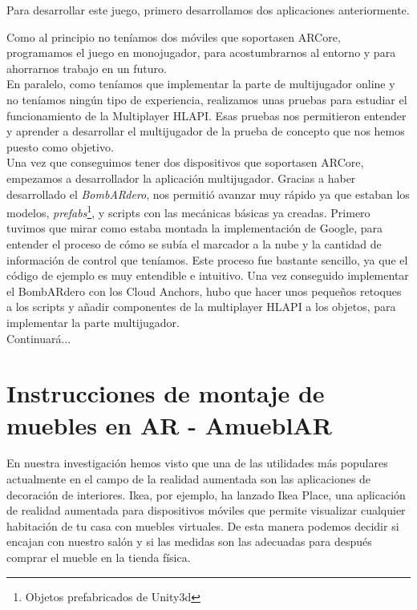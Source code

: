 Para desarrollar este juego, primero desarrollamos dos aplicaciones anteriormente.

Como al principio no teníamos dos móviles que soportasen ARCore, programamos el juego en monojugador, para acostumbrarnos al entorno y para ahorrarnos trabajo en un futuro.\\

En paralelo, como teníamos que implementar la parte de multijugador online y no teníamos ningún tipo de experiencia, realizamos unas pruebas para estudiar el funcionamiento de la Multiplayer HLAPI. Esas pruebas nos permitieron entender y aprender a desarrollar el multijugador de la prueba de concepto que nos hemos puesto como objetivo.\\

Una vez que conseguimos tener dos dispositivos que soportasen ARCore, empezamos a desarrollador la aplicación multijugador. Gracias a haber desarrollado el \textit{BombARdero}, nos permitió avanzar muy rápido ya que estaban los modelos, \textit{prefabs}\footnote{ Objetos prefabricados de Unity3d}, y scripts con las mecánicas básicas ya creadas. Primero tuvimos que mirar como estaba montada la implementación de Google, para entender el proceso de cómo se subía el marcador a la nube y la cantidad de información de control que teníamos. Este proceso fue bastante sencillo, ya que el código de ejemplo es muy entendible e intuitivo. Una vez conseguido implementar el BombARdero con los Cloud Anchors, hubo que hacer unos pequeños retoques a los scripts y añadir componentes de la multiplayer HLAPI a los objetos, para implementar la parte multijugador.\\
Continuará...


\clearpage
\section{Instrucciones de montaje de muebles en AR - AmueblAR}

En nuestra investigación hemos visto que una de las utilidades más populares actualmente en el campo de la realidad aumentada son las aplicaciones de decoración de interiores. Ikea, por ejemplo, ha lanzado Ikea Place, una aplicación de realidad aumentada para dispositivos móviles que permite visualizar cualquier habitación de tu casa con muebles virtuales. De esta manera podemos decidir si encajan con nuestro salón y si las medidas son las adecuadas para después comprar el mueble en la tienda física.\\

